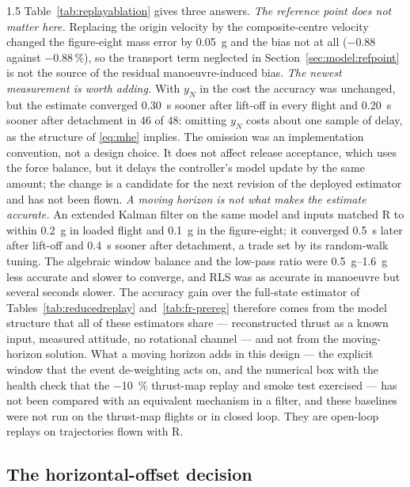 \begin{spacing}{1.5}
Table~\ref{tab:replayablation} gives three answers. \emph{The reference point
does not matter here.} Replacing the origin velocity by the composite-centre
velocity changed the figure-eight mass error by \SI{0.05}{\gram} and the bias not
at all ($-0.88$ against $-0.88$\,\%), so the transport term neglected in
Section~\ref{sec:model:refpoint} is not the source of the residual
manoeuvre-induced bias. \emph{The newest measurement is worth adding.} With
$y_N$ in the cost the accuracy was unchanged, but the estimate converged
\SI{0.30}{\second} sooner after lift-off in every flight and \SI{0.20}{\second}
sooner after detachment in $46$ of $48$: omitting $y_N$ costs about one sample
of delay, as the structure of \eqref{eq:mhe} implies. The omission was an
implementation convention, not a design choice. It does not affect release
acceptance, which uses the force balance, but it delays the controller's model
update by the same amount; the change is a candidate for the next revision of the
deployed estimator and has not been flown. \emph{A moving horizon is not what
makes the estimate accurate.} An extended Kalman filter on the same model and
inputs matched R to within \SI{0.2}{\gram} in loaded flight and
\SI{0.1}{\gram} in the figure-eight; it converged \SI{0.5}{\second} later after
lift-off and \SI{0.4}{\second} sooner after detachment, a trade set by its
random-walk tuning. The algebraic window balance and the low-pass ratio were
\SIrange{0.5}{1.6}{\gram} less accurate and slower to converge, and RLS was as
accurate in manoeuvre but several seconds slower. The accuracy gain over the
full-state estimator of Tables~\ref{tab:reducedreplay} and~\ref{tab:fr-prereg}
therefore comes from the model structure that all of these estimators share ---
reconstructed thrust as a known input, measured attitude, no rotational channel
--- and not from the moving-horizon solution. What a moving horizon adds in this
design --- the explicit window that the event de-weighting acts on, and the
numerical box with the health check that the \SI{-10}{\percent} thrust-map
replay and smoke test exercised --- has not been compared with an equivalent
mechanism in a filter, and these baselines were not run on the thrust-map flights
or in closed loop. They are open-loop replays on trajectories flown with R.

\subsection{The horizontal-offset decision}\label{sec:eval:eccablation}


\end{spacing}
